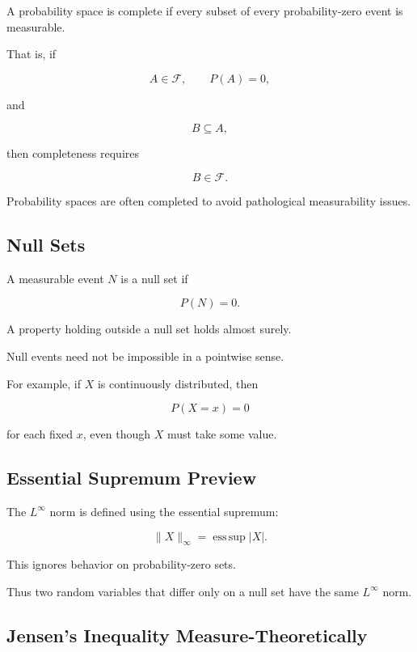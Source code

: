 A probability space is complete if every subset of every probability-zero
event is measurable.

That is, if

\[
A\in\mathcal{F},
\qquad
P(A)=0,
\]

and

\[
B\subseteq A,
\]

then completeness requires

\[
\boxed{
B\in\mathcal{F}.
}
\]

Probability spaces are often completed to avoid pathological
measurability issues.

\subsection{Null Sets}
\label{subsec:null-sets-probability}

A measurable event \(N\) is a null set if

\[
\boxed{
P(N)=0.
}
\]

A property holding outside a null set holds almost surely.

Null events need not be impossible in a pointwise sense.

For example, if \(X\) is continuously distributed, then

\[
P(X=x)=0
\]

for each fixed \(x\), even though \(X\) must take some value.

\subsection{Essential Supremum Preview}
\label{subsec:essential-supremum-preview}

The \(L^\infty\) norm is defined using the essential supremum:

\[
\boxed{
\|X\|_\infty
=
\operatorname*{ess\,sup}|X|.
}
\]

This ignores behavior on probability-zero sets.

Thus two random variables that differ only on a null set have the same
\(L^\infty\) norm.

\subsection{Jensen's Inequality Measure-Theoretically}
\label{subsec:jensen-measure-probability}

